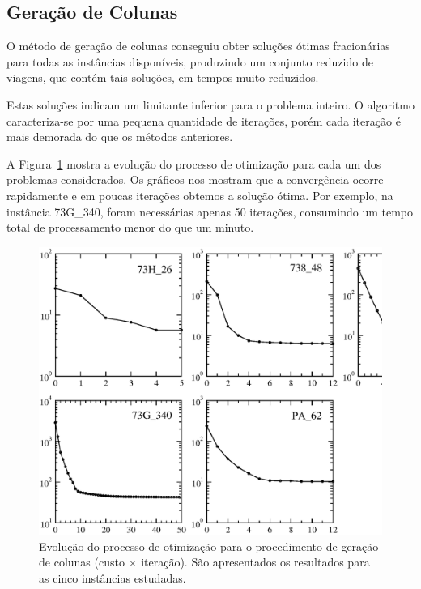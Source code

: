
\subsection{Geração de Colunas}
\label{sec:resultados_cg}

O método de geração de colunas conseguiu obter soluções ótimas fracionárias para todas as instâncias
disponíveis, produzindo um conjunto reduzido de viagens, que contém tais soluções, em tempos muito
reduzidos. 

Estas soluções indicam um limitante inferior para o problema inteiro. O algoritmo
caracteriza-se por uma pequena quantidade de iterações, porém cada iteração é mais demorada do que
os métodos anteriores.

A Figura~\ref{fig:cg_results} mostra a evolução do processo de otimização para cada um dos problemas
considerados. Os gráficos nos mostram que a convergência ocorre rapidamente e em poucas
iterações obtemos a solução ótima. Por exemplo, na instância 73G\_340, foram necessárias apenas
50 iterações, consumindo um tempo total de processamento menor do que um minuto. 

\begin{figure}[htbp]
	\begin{center}
		\includegraphics[scale=0.5]{fig/cg_results.eps}
		\caption{Evolução do processo de otimização para o procedimento de geração de colunas (custo 
		$\times$ iteração). São apresentados os resultados para as cinco instâncias
		estudadas.}
		\label{fig:cg_results}
	\end{center}
\end{figure}

